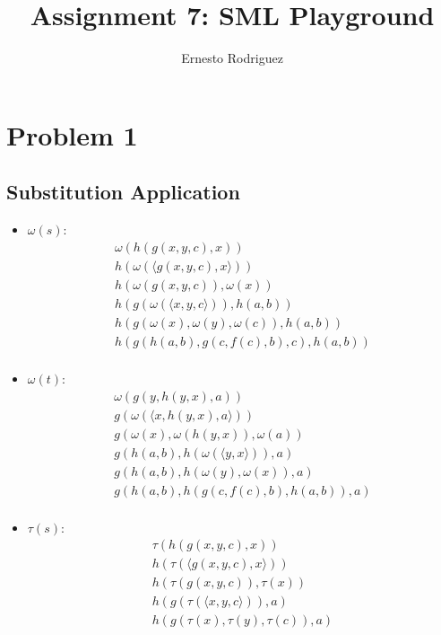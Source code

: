 \documentclass[11pt]{article}
\author{Ernesto Rodriguez}
\title{Assignment 7: SML Playground}
\begin{document}
\maketitle

\section{Problem 1}

\subsection{Substitution Application}

\begin{itemize}
  \item{$\omega(s)$:
    \[
    \begin{array}{ll}
      \omega(h(g(x,y,c),x))\\
      h(\omega(\langle g(x,y,c),x \rangle))\\
      h(\omega (g(x,y,c)),\omega(x))\\
      h(g(\omega (\langle x,y,c \rangle)),h(a,b))\\
      h(g(\omega(x),\omega(y),\omega(c)),h(a,b))\\
      h(g(h(a,b),g(c,f(c),b),c),h(a,b))\\
    \end{array}
    \]
    }
  \item{$\omega(t)$:
    \[
    \begin{array}{ll}
      \omega(g(y,h(y,x),a))\\
      g(\omega(\langle x,h(y,x),a\rangle))\\
      g(\omega(x),\omega(h(y,x)),\omega(a))\\
      g(h(a,b),h(\omega(\langle y,x\rangle)),a)\\
      g(h(a,b),h(\omega(y),\omega(x)),a)\\
      g(h(a,b),h(g(c,f(c),b),h(a,b)),a)\\
    \end{array}
    \]
  }
  \item{$\tau(s)$:
    \[
    \begin{array}{ll}
      \tau(h(g(x,y,c),x))\\
      h(\tau(\langle g(x,y,c),x\rangle))\\
      h(\tau(g(x,y,c)),\tau(x))\\
      h(g(\tau(\langle x,y,c\rangle)),a)\\
      h(g(\tau(x),\tau(y),\tau(c)),a)\\

\end{array}\]}
\end{itemize}
\end{document}
